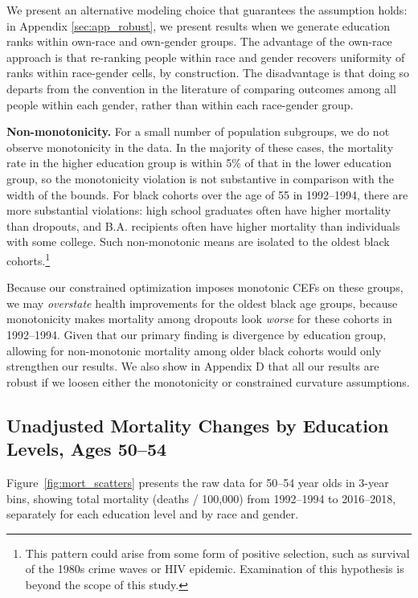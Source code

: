 \documentclass[12pt,letterpaper]{article}
\numberwithin{equation}{section}
\begin{document}
We present an alternative modeling choice that guarantees the
assumption holds: in Appendix
\ref{sec:app_robust}, we present results when we generate education
ranks within own-race and own-gender groups. The advantage of the
own-race approach is that re-ranking people within race and gender
recovers uniformity of ranks within race-gender cells, by
construction. The disadvantage is that doing so departs from the
convention in the literature of comparing outcomes among all people
within each gender, rather than within each race-gender group.

\textbf{Non-monotonicity.} For a small number of population subgroups, we do not observe monotonicity in the data. In the majority of these cases, the mortality rate in the higher education group is within 5\% of that in the lower education group, so the monotonicity violation is not substantive in comparison with the width of the bounds. For black cohorts over the age of 55 in 1992--1994, there are more substantial violations: high school graduates often have higher mortality than dropouts, and B.A. recipients often have higher mortality than individuals with some college. Such non-monotonic means are isolated to the oldest black cohorts.\footnote{This pattern could arise from some form of positive selection, such as survival of the 1980s crime waves or HIV epidemic. Examination of this hypothesis is beyond the scope of this study.}

Because our constrained optimization imposes monotonic CEFs on these groups, we may \textit{overstate} health improvements for the oldest black age groups, because monotonicity makes mortality among dropouts look \textit{worse} for these cohorts in 1992--1994. Given that our primary finding is divergence by education group, allowing for non-monotonic mortality among older black cohorts would only strengthen our results. We also show in Appendix D that all our results are robust if we loosen either the monotonicity or constrained curvature assumptions.

\subsection{Unadjusted Mortality Changes by Education Levels, Ages 50--54}

\label{sec:naive}

Figure~\ref{fig:mort_scatters} presents the raw data for 50--54 year olds in 3-year bins, showing total mortality (deaths / 100,000) from 1992--1994 to 2016--2018, separately for each education level and by race and gender.
\end{document}
